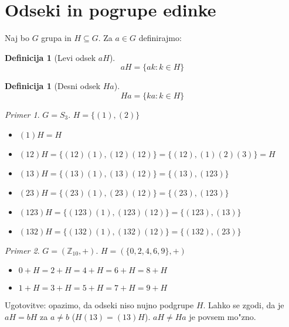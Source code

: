 \documentclass[11pt, a4paper]{article}
\theoremstyle{definition}
\newtheorem{defn}[counter]{Definicija}
\theoremstyle{remark}
\newtheorem*{ex}{Primer}
\newcommand{\Z}{\mathbb{Z}}
\begin{document}
	\section{Odseki in pogrupe edinke}
	Naj bo $G$ grupa in $H \subseteq G$. Za $a \in G$ definirajmo:	
	\begin{defn}[Levi odsek $aH$]
		\[ aH = \lbrace ak: k \in H \rbrace \]
	\end{defn}
	\begin{defn}[Desni odsek $Ha$]
		\[ Ha = \lbrace ka: k \in H \rbrace \]
	\end{defn}

	\begin{ex}
		$G = S_3$. $H = \lbrace (1), (2) \rbrace $
		\begin{itemize}
			\item $(1)H = H$
			\item $(12)H = \lbrace (12)(1), (12)(12) \rbrace = \lbrace (12),(1)(2)(3)\rbrace = H $
			\item $(13)H = \lbrace (13)(1), (13)(12) \rbrace = \lbrace (13),(123) \rbrace $
			\item $(23)H = \lbrace (23)(1), (23)(12)\rbrace = \lbrace (23),(123) \rbrace $
			\item $(123)H = \lbrace (123)(1), (123)(12) \rbrace = \lbrace (123),(13) \rbrace $
			\item $(132)H = \lbrace (132)(1), (132)(12) \rbrace = \lbrace (132),(23) \rbrace $
		\end{itemize}
	\end{ex}
	\begin{ex}
		$G = (\Z_{10}, +)$. $H = (\lbrace 0, 2, 4, 6, 9 \rbrace, +)$
		\begin{itemize}
			\item $0+H = 2 + H = 4 + H = 6 + H = 8 + H$
			\item $1+H = 3 + H = 5 + H = 7 + H = 9 + H$
		\end{itemize}
	\end{ex}
	Ugotovitve: opazimo, da odseki niso nujno podgrupe $H$. Lahko se zgodi, da je $aH = bH$ za $a \neq b$ ($H(13) = (13)H$). $aH \neq Ha$ je povsem mo"zno.
	
\end{document}
